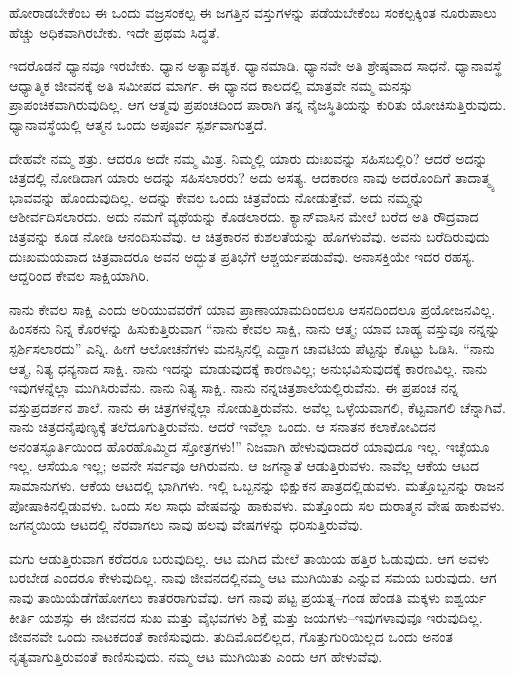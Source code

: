 ಹೋರಾಡಬೇಕೆಂಬ ಈ ಒಂದು ವಜ್ರಸಂಕಲ್ಪ ಈ ಜಗತ್ತಿನ ವಸ್ತುಗಳನ್ನು ಪಡೆಯಬೇಕೆಂಬ ಸಂಕಲ್ಪಕ್ಕಿಂತ ನೂರುಪಾಲು ಹೆಚ್ಚು ಅಧಿಕವಾಗಿರಬೇಕು. ಇದೇ ಪ್ರಥಮ ಸಿದ್ಧತೆ.

ಇದರೊಡನೆ ಧ್ಯಾನವೂ ಇರಬೇಕು. ಧ್ಯಾನ ಅತ್ಯಾವಶ್ಯಕ. ಧ್ಯಾನಮಾಡಿ. ಧ್ಯಾನವೇ ಅತಿ ಶ್ರೇಷ್ಠವಾದ ಸಾಧನೆ. ಧ್ಯಾನಾವಸ್ಥೆ ಆಧ್ಯಾತ್ಮಿಕ ಜೀವನಕ್ಕೆ ಅತಿ ಸಮೀಪದ ಮಾರ್ಗ. ಈ ಧ್ಯಾನದ ಕಾಲದಲ್ಲಿ ಮಾತ್ರವೇ ನಮ್ಮ ಮನಸ್ಸು ಪ್ರಾಪಂಚಿಕವಾಗಿರುವುದಿಲ್ಲ. ಆಗ ಆತ್ಮವು ಪ್ರಪಂಚದಿಂದ ಪಾರಾಗಿ ತನ್ನ ನೈಜಸ್ಥಿತಿಯನ್ನು ಕುರಿತು ಯೋಚಿಸುತ್ತಿರುವುದು. ಧ್ಯಾನಾವಸ್ಥೆಯಲ್ಲಿ ಆತ್ಮನ ಒಂದು ಅಪೂರ್ವ ಸ್ಪರ್ಶವಾಗುತ್ತದೆ.

ದೇಹವೇ ನಮ್ಮ ಶತ್ರು. ಆದರೂ ಅದೇ ನಮ್ಮ ಮಿತ್ರ. ನಿಮ್ಮಲ್ಲಿ ಯಾರು ದುಃಖವನ್ನು ಸಹಿಸಬಲ್ಲಿರಿ? ಆದರೆ ಅದನ್ನು ಚಿತ್ರದಲ್ಲಿ ನೋಡಿದಾಗ ಯಾರು ಅದನ್ನು ಸಹಿಸಲಾರರು? ಅದು ಅಸತ್ಯ. ಆದಕಾರಣ ನಾವು ಅದರೊಂದಿಗೆ ತಾದಾತ್ಮ್ಯ ಭಾವವನ್ನು ಹೊಂದುವುದಿಲ್ಲ. ಅದನ್ನು ಕೇವಲ ಒಂದು ಚಿತ್ರವೆಂದು ನೋಡುತ್ತೇವೆ. ಅದು ನಮ್ಮನ್ನು ಆಶೀರ್ವದಿಸಲಾರದು. ಅದು ನಮಗೆ ವ್ಯಥೆಯನ್ನು ಕೊಡಲಾರದು. ಕ್ಯಾನ್​ವಾಸಿನ ಮೇಲೆ ಬರೆದ ಅತಿ ರೌದ್ರವಾದ ಚಿತ್ರವನ್ನು ಕೂಡ ನೋಡಿ ಆನಂದಿಸುವೆವು. ಆ ಚಿತ್ರಕಾರನ ಕುಶಲತೆಯನ್ನು ಹೊಗಳುವೆವು. ಅವನು ಬರೆದಿರುವುದು ದುಃಖಮಯವಾದ ಚಿತ್ರವಾದರೂ ಅವನ ಅದ್ಭುತ ಪ್ರತಿಭೆಗೆ ಆಶ್ಚರ್ಯಪಡುವೆವು. ಅನಾಸಕ್ತಿಯೇ ಇದರ ರಹಸ್ಯ. ಆದ್ದರಿಂದ ಕೇವಲ ಸಾಕ್ಷಿಯಾಗಿರಿ.

ನಾನು ಕೇವಲ ಸಾಕ್ಷಿ ಎಂದು ಅರಿಯುವವರೆಗೆ ಯಾವ ಪ್ರಾಣಾಯಾಮದಿಂದಲೂ ಆಸನದಿಂದಲೂ ಪ್ರಯೋಜನವಿಲ್ಲ. ಹಿಂಸಕನು ನಿನ್ನ ಕೊರಳನ್ನು ಹಿಸುಕುತ್ತಿರುವಾಗ “ನಾನು ಕೇವಲ ಸಾಕ್ಷಿ, ನಾನು ಆತ್ಮ; ಯಾವ ಬಾಹ್ಯ ವಸ್ತುವೂ ನನ್ನನ್ನು ಸ್ಪರ್ಶಿಸಲಾರದು” ಎನ್ನಿ. ಹೀಗೆ ಆಲೋಚನೆಗಳು ಮನಸ್ಸಿನಲ್ಲಿ ಎದ್ದಾಗ ಚಾವಟಿಯ ಪೆಟ್ಟನ್ನು ಕೊಟ್ಟು ಓಡಿಸಿ. “ನಾನು ಆತ್ಮ, ನಿತ್ಯ ಧನ್ಯನಾದ ಸಾಕ್ಷಿ. ನಾನು ಇದನ್ನು ಮಾಡುವುದಕ್ಕೆ ಕಾರಣವಿಲ್ಲ; ಅನುಭವಿಸುವು\break ದಕ್ಕೆ ಕಾರಣವಿಲ್ಲ. ನಾನು ಇವುಗಳನ್ನೆಲ್ಲಾ ಮುಗಿಸಿರುವೆನು. ನಾನು ನಿತ್ಯ ಸಾಕ್ಷಿ. ನಾನು ನನ್ನ\break ಚಿತ್ರಶಾಲೆಯಲ್ಲಿರುವೆನು. ಈ ಪ್ರಪಂಚ ನನ್ನ ವಸ್ತುಪ್ರದರ್ಶನ ಶಾಲೆ. ನಾನು ಈ ಚಿತ್ರಗಳ\break ನ್ನೆಲ್ಲಾ ನೋಡುತ್ತಿರುವೆನು. ಅವೆಲ್ಲ ಒಳ್ಳೆಯವಾಗಲಿ, ಕೆಟ್ಟವಾಗಲಿ ಚೆನ್ನಾಗಿವೆ. ನಾನು ಚಿತ್ರದ\break ನೈಪುಣ್ಯಕ್ಕೆ ತಲೆದೂಗುತ್ತಿರುವೆನು. ಆದರೆ ಇವೆಲ್ಲಾ ಒಂದು. ಆ ಸನಾತನ ಕಲಾಕೋವಿದನ ಅನಂತಸ್ಫೂರ್ತಿಯಿಂದ ಹೊರಹೊಮ್ಮಿದ ಸ್ತೋತ್ರಗಳು!” ನಿಜವಾಗಿ ಹೇಳುವುದಾದರೆ ಯಾವುದೂ ಇಲ್ಲ. ಇಚ್ಛೆಯೂ ಇಲ್ಲ. ಆಸೆಯೂ ಇಲ್ಲ; ಅವನೇ ಸರ್ವವೂ ಆಗಿರುವನು. ಆ ಜಗನ್ಮಾತೆ ಆಡುತ್ತಿರುವಳು. ನಾವೆಲ್ಲ ಆಕೆಯ ಆಟದ ಸಾಮಾನುಗಳು. ಆಕೆಯ ಆಟದಲ್ಲಿ ಭಾಗಿಗಳು. ಇಲ್ಲಿ ಒಬ್ಬನನ್ನು ಭಿಕ್ಷುಕನ ಪಾತ್ರದಲ್ಲಿಡುವಳು. ಮತ್ತೊಬ್ಬನನ್ನು ರಾಜನ ಪೋಷಾಕಿನಲ್ಲಿಡುವಳು. ಒಂದು ಸಲ ಸಾಧು ವೇಷವನ್ನು ಹಾಕುವಳು. ಮತ್ತೊಂದು ಸಲ ದುರಾತ್ಮನ ವೇಷ ಹಾಕುವಳು. ಜಗನ್ಮಯಿಯ ಆಟದಲ್ಲಿ ನೆರವಾಗಲು ನಾವು ಹಲವು ವೇಷಗಳನ್ನು ಧರಿಸುತ್ತಿರುವೆವು.

ಮಗು ಆಡುತ್ತಿರುವಾಗ ಕರೆದರೂ ಬರುವುದಿಲ್ಲ. ಆಟ ಮಗಿದ ಮೇಲೆ ತಾಯಿಯ ಹತ್ತಿರ ಓಡುವುದು. ಆಗ ಅವಳು ಬರಬೇಡ ಎಂದರೂ ಕೇಳುವುದಿಲ್ಲ. ನಾವು ಜೀವನದಲ್ಲಿ\break ನಮ್ಮ ಆಟ ಮುಗಿಯಿತು ಎನ್ನುವ ಸಮಯ ಬರುವುದು. ಆಗ ನಾವು ತಾಯಿಯೆಡೆಗೆ\break ಹೋಗಲು ಕಾತರರಾಗುವೆವು. ಆಗ ನಾವು ಪಟ್ಟ ಪ್ರಯತ್ನ–ಗಂಡ ಹೆಂಡತಿ ಮಕ್ಕಳು ಐಶ್ವರ್ಯ ಕೀರ್ತಿ ಯಶಸ್ಸು ಈ ಜೀವನದ ಸುಖ ಮತ್ತು ವೈಭವಗಳು ಶಿಕ್ಷೆ ಮತ್ತು ಜಯ\break ಗಳು–ಇವುಗಳಾವುವೂ ಇರುವುದಿಲ್ಲ. ಜೀವನವೇ ಒಂದು ನಾಟಕದಂತೆ ಕಾಣಿಸುವುದು. ತುದಿಮೊದಲಿಲ್ಲದ, ಗೊತ್ತುಗುರಿಯಿಲ್ಲದ ಒಂದು ಅನಂತ ನೃತ್ಯವಾಗುತ್ತಿರುವಂತೆ ಕಾಣಿಸುವುದು. ನಮ್ಮ ಆಟ ಮುಗಿಯಿತು ಎಂದು ಆಗ ಹೇಳುವೆವು.

